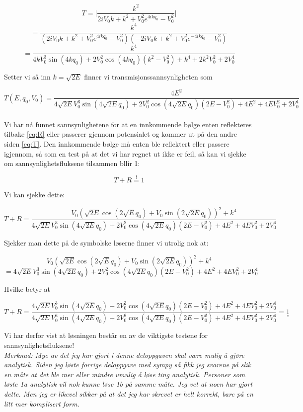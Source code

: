 \documentclass[a4paper,norsk, 10pt]{article}
\numberwithin{equation}{section}
\begin{document}
$$
T = \bigg|\frac{k^2}{2iV_0k + k^2 +V_0^2e^{4ikq_0} - V_0^2}\bigg| 
$$
$$
= \frac{k^4}{(2iV_0k + k^2 +V_0^2e^{4ikq_0} - V_0^2)(-2iV_0k + k^2 +V_0^2e^{-4ikq_0} - V_0^2)}
$$
$$
 = \frac{k^4}{4kV_0^3\sin(4kq_0) + 2V_0^2\cos(4kq_0)(k^2 - V_0^2)+k^4 +2k^2V_0^2 + 2V_0^4}
$$

Setter vi så inn $k = \sqrt{2E}$ finner vi transmisjonssannsynligheten som

\begin{equation}
T(E,q_0,V_0) = \frac{4E^2}{4\sqrt{2E}V_0^3\sin(4\sqrt{2E} q_0) + 2V_0^2\cos(4\sqrt{2E} q_0)(2E - V_0^2)+4E^2 +4EV_0^2 + 2V_0^4}
\label{eq:T}
\end{equation} \\

Vi har nå funnet sannsynlighetene for at en innkommende bølge enten reflekteres tilbake \eqref{eq:R} eller passerer gjennom potensialet og kommer ut på den andre siden \eqref{eq:T}. Den innkommende bølge må enten ble reflektert eller passere igjennom, så som en test på at det vi har regnet ut ikke er feil, så kan vi sjekke om sannsynlighetsfluksene tilsammen bllir 1:

$$
T + R \overset{!}{=} 1
$$


Vi kan sjekke dette:

$$
T + R = \frac{V_0\left(\sqrt{2E}\cos(2\sqrt{E}q_0) + V_0\sin(2\sqrt{2E} q_0)\right)^2 + k^4}{4\sqrt{2E}V_0^3\sin(4\sqrt{2E} q_0) + 2V_0^2\cos(4\sqrt{2E} q_0)(2E - V_0^2)+4E^2 +4EV_0^2 + 2V_0^4}
$$

Sjekker man dette på de symbolske løserne finner vi utrolig nok at:

$$
V_0\left(\sqrt{2E}\cos(2\sqrt{E}q_0) + V_0\sin(2\sqrt{2E} q_0)\right)^2 + k^4
$$
$$
= 4\sqrt{2E}V_0^3\sin(4\sqrt{2E} q_0) + 2V_0^2\cos(4\sqrt{2E} q_0)(2E - V_0^2)+4E^2 +4EV_0^2 + 2V_0^4
$$

Hvilke betyr at

$$
T + R = \frac{4\sqrt{2E}V_0^3\sin(4\sqrt{2E} q_0) + 2V_0^2\cos(4\sqrt{2E} q_0)(2E - V_0^2)+4E^2 +4EV_0^2 + 2V_0^4}{4\sqrt{2E}V_0^3\sin(4\sqrt{2E} q_0) + 2V_0^2\cos(4\sqrt{2E} q_0)(2E - V_0^2)+4E^2 +4EV_0^2 + 2V_0^4} = \underline{\underline{1}}
$$

Vi har derfor vist at løsningen består en av de viktigste testene for sannsynlighetsfluksene!\\

\textit{Merknad: Mye av det jeg har gjort i denne deloppgaven skal være mulig å gjøre analytisk. Siden jeg løste forrige deloppgave med sympy så fikk jeg svarene på slik en måte at det ble mer eller mindre umulig å løse ting analytisk. Personer som løste 1a analytisk vil nok kunne løse 1b på samme måte. Jeg vet at noen har gjort dette. Men jeg er likevel sikker på at det jeg har skrevet er helt korrekt, bare på en litt mer komplisert form.}
\end{document}
